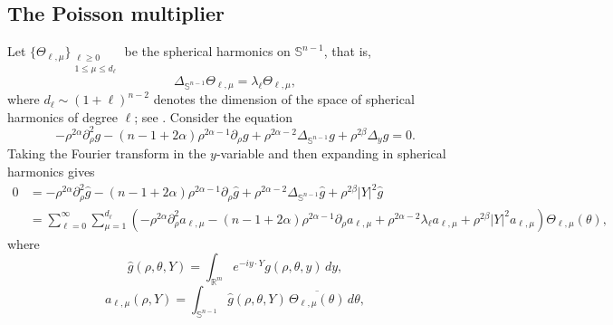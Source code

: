 \documentclass[12pt]{amsart}
\begin{document}




\subsection{The Poisson multiplier}

Let $\{\Theta_{\ell,\mu}\}_{\substack{\ell\ge 0\\ 1\le \mu\le d_\ell}}$ be the spherical harmonics on $\mathbb{S}^{n-1}$, that is,
\begin{equation*}
    \Delta_{\mathbb{S}^{n-1}} \Theta_{\ell,\mu} = \lambda_{\ell} \Theta_{\ell,\mu},
\end{equation*}
where $d_\ell \sim (1+\ell)^{n-2}$ denotes the dimension of the space of spherical harmonics of degree $\ell$; see \cite[Chapter~IV]{SW2}. Consider the equation
\begin{equation*}
    - \rho^{2\alpha} \partial_\rho^2 g - (n-1+2\alpha) \rho^{2\alpha-1} \partial_\rho g + \rho^{2\alpha -2} \Delta_{\mathbb{S}^{n-1}}g + \rho^{2\beta} \Delta_y g = 0.
\end{equation*}
Taking the Fourier transform in the $y$-variable and then expanding in spherical harmonics gives
\begin{align*}
    0 &= - \rho^{2\alpha} \partial_\rho^2 \hat{g} - (n-1+2\alpha) \rho^{2\alpha-1} \partial_\rho \hat{g} + \rho^{2\alpha -2} \Delta_{\mathbb{S}^{n-1}} \hat{g} + \rho^{2\beta} |Y|^2 \hat{g}\\
    &= \sum_{\ell=0}^\infty \sum_{\mu=1}^{d_\ell} \left(  - \rho^{2\alpha} \partial_\rho^2 a_{\ell,\mu} - (n-1+2\alpha) \rho^{2\alpha-1} \partial_\rho a_{\ell,\mu} + \rho^{2\alpha -2} \lambda_{\ell} a_{\ell,\mu} + \rho^{2\beta} |Y|^2 a_{\ell,\mu}  \right) \Theta_{\ell,\mu}(\theta),
\end{align*}
where
\begin{equation*}
    \hat{g}(\rho,\theta,Y) = \int_{\mathbb{R}^m} e^{-iy \cdot Y} g(\rho,\theta,y)\, dy,
\end{equation*}
\begin{equation*}
    a_{\ell,\mu}(\rho,Y) = \int_{\mathbb{S}^{n-1}} \hat{g}(\rho,\theta,Y)\, \overline{\Theta_{\ell,\mu}(\theta)}\, d\theta,
\end{equation*}
\end{document}
